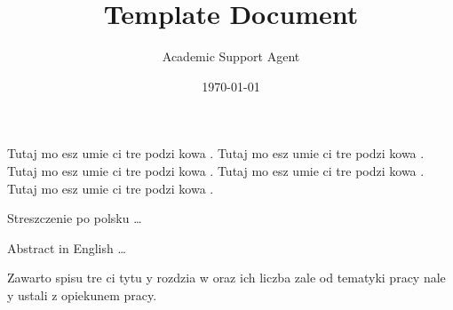 \documentclass{article}
\title{Template Document}
\author{Academic Support Agent}
\date{\today}
\begin{document}
\maketitle


\maketitle %

\thispagestyle{empty}
\vspace*{\fill}
\begin{flushright}
    \em
    \begin{minipage}{0.75\textwidth}
        Tutaj mo esz umie ci  tre  podzi kowa .
        Tutaj mo esz umie ci  tre  podzi kowa .
        Tutaj mo esz umie ci  tre  podzi kowa .
        Tutaj mo esz umie ci  tre  podzi kowa .
        Tutaj mo esz umie ci  tre  podzi kowa .
    \end{minipage}
\end{flushright}
\begin{abstractPL}
    Streszczenie po polsku \ldots
\end{abstractPL}
\begin{abstractEN}
    Abstract in English \ldots
\end{abstractEN}

\begin{shaded}
    Zawarto  spisu tre ci \pauza tytu y rozdzia w oraz ich liczba zale  od tematyki pracy \pauza nale y ustali  z opiekunem pracy.
\end{shaded}


\listofalgorithms  %
\lstlistoflistings %
\printnomenclature %



\end{document}

